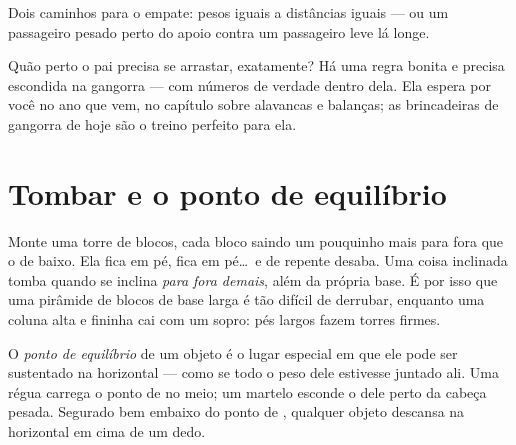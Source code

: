 \begin{omfigure}

{\small Dois caminhos para o empate: pesos iguais a distâncias iguais
--- ou um passageiro pesado perto do apoio contra um passageiro leve
lá longe.}
\end{omfigure}

\begin{remark}\label{rem:g2:balance-equilibrium:promise}
Quão perto o pai precisa se arrastar, exatamente? Há uma regra bonita
e precisa escondida na gangorra --- com números de verdade dentro
dela. Ela espera por você no ano que vem, no capítulo sobre alavancas
e balanças; as brincadeiras de gangorra de hoje são o treino perfeito
para ela.
\end{remark}

\section{Tombar e o ponto de equilíbrio}

\begin{example}\label{ex:g2:balance-equilibrium:tower}
Monte uma torre de blocos, cada bloco saindo um pouquinho mais para
fora que o de baixo. Ela fica em pé, fica em pé\dots\ e de repente
desaba. Uma coisa inclinada tomba quando se inclina \emph{para fora
demais}, além da própria base. É por isso que uma pirâmide de blocos
de base larga é tão difícil de derrubar, enquanto uma coluna alta e
fininha cai com um sopro: pés largos fazem torres firmes.
\end{example}

\begin{definition}\label{def:g2:balance-equilibrium:point}
O \emph{ponto de equilíbrio} de um objeto
é o lugar especial em que ele pode ser sustentado na horizontal ---
como se todo o peso dele estivesse juntado ali. Uma régua carrega o
ponto de  no meio; um martelo esconde o dele perto da
cabeça pesada. Segurado bem embaixo do ponto de , qualquer
objeto descansa na horizontal em cima de um dedo.
\end{definition}

